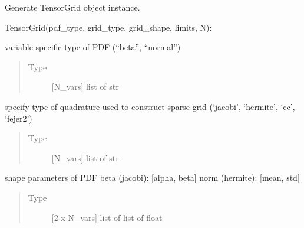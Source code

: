 \documentclass[letterpaper,10pt,english,openany,oneside]{sphinxmanual}
\begin{document}
\begin{fulllineitems}
\label{\detokenize{pygpc:pygpc.grid.TensorGrid}}
Generate TensorGrid object instance.

TensorGrid(pdf\_type, grid\_type, grid\_shape, limits, N):

\begin{fulllineitems}
\label{\detokenize{pygpc:pygpc.grid.TensorGrid.pdf_type}}
variable specific type of PDF (“beta”, “normal”)
\begin{quote}\begin{description}
\item[{Type}] \leavevmode
{[}N\_vars{]} list of str

\end{description}\end{quote}

\end{fulllineitems}


\begin{fulllineitems}
\label{\detokenize{pygpc:pygpc.grid.TensorGrid.grid_type}}
specify type of quadrature used to construct sparse grid (‘jacobi’, ‘hermite’, ‘cc’, ‘fejer2’)
\begin{quote}\begin{description}
\item[{Type}] \leavevmode
{[}N\_vars{]} list of str

\end{description}\end{quote}

\end{fulllineitems}


\begin{fulllineitems}
\label{\detokenize{pygpc:pygpc.grid.TensorGrid.grid_shape}}
shape parameters of PDF
beta (jacobi):  {[}alpha, beta{]}
norm (hermite): {[}mean, std{]}
\begin{quote}\begin{description}
\item[{Type}] \leavevmode
{[}2 x N\_vars{]} list of list of float


\end{description}
\end{quote}
\end{fulllineitems}
\end{fulllineitems}
\end{document}
